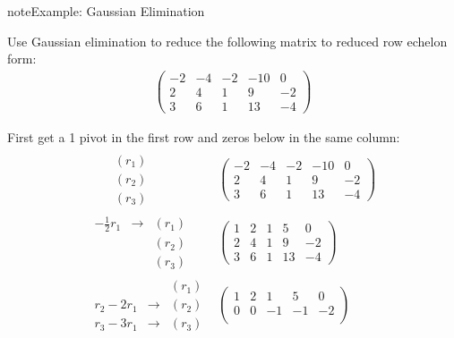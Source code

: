 \documentclass[letterpaper,10pt,english]{jupyterBook}
\begin{document}
\begin{sphinxadmonition}{note}{Example: Gaussian Elimination}

\sphinxAtStartPar
Use Gaussian elimination to reduce the following matrix to reduced row echelon form:
\begin{equation*}
\begin{split}
\begin{pmatrix}
-2 & -4 & -2 & -10 & 0\\
2 & 4 & 1 & 9 & -2\\
3 & 6 & 1 & 13 & -4
\end{pmatrix}
\end{split}
\end{equation*}
\sphinxAtStartPar
{}

\sphinxAtStartPar
First get a 1 pivot in the first row and zeros below in the same column:
\begin{equation*}
\begin{split}
\begin{array}{rc}
\begin{array}{ccr}
 & & (r_1)\\
 & & (r_2)\\
& & (r_3)
\end{array}
&
\begin{pmatrix}
-2 & -4 & -2 & -10 & 0\\
2 & 4 & 1 & 9 & -2\\
3 & 6 & 1 & 13 & -4
\end{pmatrix}\\
\begin{array}{ccr}
 -\frac{1}{2}r_1 & \longrightarrow & (r_1)\\
 & & (r_2)\\
& & (r_3)
\end{array}
&
\begin{pmatrix}
1 & 2 & 1 & 5 & 0\\
2 & 4 & 1 & 9 & -2\\
3 & 6 & 1 & 13 & -4
\end{pmatrix}\\
\begin{array}{ccr}
 & & (r_1)\\
 r_2 - 2r_1 & \longrightarrow & (r_2)\\
 r_3 - 3r_1& \longrightarrow & (r_3)
\end{array}
&
\begin{pmatrix}
\boxed{1} & 2 & 1 & 5 & 0\\
0 & 0 & -1 & -1 & -2\\

\end{pmatrix}
\end{array}
\end{split}
\end{equation*}
\end{sphinxadmonition}
\end{document}
